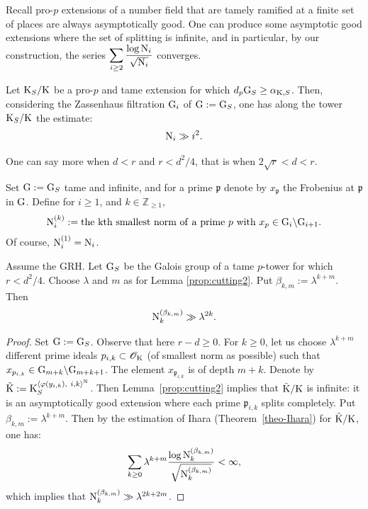 \documentclass[12pt,a4paper,twoside,english]{smfart}
\def\Z{{\mathbb Z}}
\def\p{{\mathfrak p}}
\def\N{{\rm N}}
\def\G{{\rm G}}
\def\K{{\rm K}}
\def\O{{\mathcal O}}
\begin{document}
Recall  pro-$p$ extensions of a number field that are tamely ramified at a finite set of places are always asymptotically good.
One can produce some asymptotic good extensions where the set of splitting is infinite, 
and in particular, by our construction, the  series   $\displaystyle{\sum_{i \geq 2} \frac{\log \N_i}{\sqrt{\N_i}}}$ converges.


\begin{theo}
Let $\K_S/\K$ be a pro-$p$ and tame extension for which $d_p\G_S \geq \alpha_{\K,S}$. Then, considering the Zassenhaus filtration $\G_i$ of $\G:=\G_S$, one has along the tower $\K_S/\K$  the estimate: $$\N_i \gg i^{2}.$$
\end{theo}

 
One can say more when $d < r$ and $r<d^2/4 $, that is when $2\sqrt{r} <d< r$.

\begin{defi} Set $\G:=\G_S$ tame and infinite, and for a prime $\p$ denote by  $x_\p$ the Frobenius at $\p$ in $\G$.
Define for $i\geq 1$, and $k \in \Z_{\geq 1}, $ $$\N_i^{(k)}:={\rm the \ kth \ smallest \  norm \ of \ a \ prime \ } \p {\rm \ with} \  x_\p \in \G_i \backslash \G_{i+1}.$$ 
Of course, $\N_i^{(1)}= \N_{i}$.
\end{defi}


\begin{theo} Assume the GRH. 
Let $\G_S$ be the Galois group of a tame $p$-tower for which~$r<d^2/4 $. Choose $\lambda$ and $m$ as for  Lemma \ref{prop:cutting2}.  Put $\beta_{k,m}:= \lambda^{k+m}$.
Then $$\N_k^{(\beta_{k,m})} \gg \lambda^{2k}.$$ 
\end{theo}

\begin{proof}  Set $\G:=\G_S$. Observe that here $r -d \geq 0$.
For $k\geq 0$, let us choose $\lambda^{k+m} $ different prime ideals $\p_{i,k} \subset \O_\K$ (of smallest norm as possible) such that $x_{\p_{i,k}} \in \G_{m+k}\backslash \G_{m+k+1}$. 
The element $x_{\p_{i,k}} $ is  of depth $m+k$.
Denote by $\tilde{\K}:=\K_S^{\langle \varphi(y_{i,k}),\ i,k\rangle^{\rm N}}$.
Then  Lemma~\ref{prop:cutting2} implies that  $\tilde{\K}/\K$ is infinite: it is   an asymptotically good extension where each prime $\p_{i,k}$ splits completely.
Put $\beta_{k,m}:= \lambda^{k+m}$.
Then by the estimation of Ihara (Theorem~\ref{theo-Ihara}) for 
$\tilde{\K}/\K$, one has: $$\sum_{k \geq 0} \lambda^{k+m} \frac{\log \N_k^{(\beta_{k,m})}}{\sqrt{\N_k^{(\beta_{k,m})}} }< \infty,$$
which implies that $\N_k^{(\beta_{k,m})} \gg \lambda^{2k+2m}$.
\end{proof}
\end{document}
